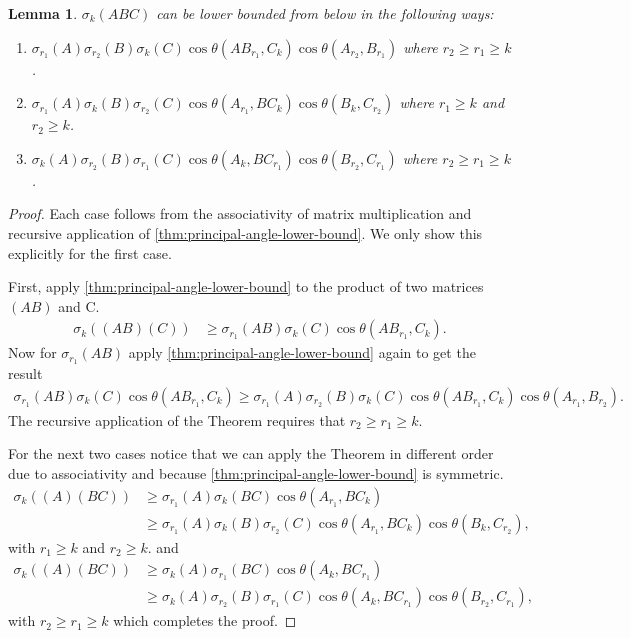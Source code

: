 \documentclass{article}
\newcommand{\prinangle}{\cos\theta}
\theoremstyle{plain}
\newtheorem{lemma}[theorem]{Lemma}
\theoremstyle{definition}
\theoremstyle{remark}
\begin{document}
\begin{lemma}
\label{lemma:principal-angle-lower-bound-3-matrices}
$\sigma_k(ABC)$ can be lower bounded from below in the following ways:
\begin{enumerate}
    \item $\sigma_{r_1}(A)\sigma_{r_2}(B)\sigma_k(C) \prinangle(AB_{r_1},C_k)\prinangle(A_{r_2}, B_{r_1})$ where $r_2 \geq r_1 \ge k$.
    \item $\sigma_{r_1}(A)\sigma_{k}(B)\sigma_{r_2}(C) \prinangle(A_{r_1},BC_k)\prinangle(B_k, C_{r_2}) $ where $r_1 \geq k$ and $r_2 \ge k$.
    \item $\sigma_{k}(A)\sigma_{r_2}(B)\sigma_{r_1}(C) \prinangle(A_{k},BC_{r_1})\prinangle(B_{r_2}, C_{r_1})$ where $r_2 \geq r_1 \ge k$.
\end{enumerate}
\end{lemma}
\begin{proof}
Each case follows from the associativity of matrix multiplication and recursive application of \cref{thm:principal-angle-lower-bound}. We only show this explicitly for the first case.

First, apply \cref{thm:principal-angle-lower-bound} to the product of two matrices $(AB)$ and C.
\begin{align*}
\sigma_k((AB)(C)) &\geq \sigma_{r_1}(AB)\sigma_k(C) \prinangle(AB_{r_1},C_k).
\end{align*}
Now for $\sigma_{r_1}(AB)$ apply \cref{thm:principal-angle-lower-bound} again to get the result
\begin{align*}
\sigma_{r_1}(AB)\sigma_k(C) \prinangle(AB_{r_1},C_k) \geq \sigma_{r_1}(A)\sigma_{r_2}(B)\sigma_k(C) \prinangle(AB_{r_1},C_k)\prinangle(A_{r_1}, B_{r_2}).
\end{align*}
The recursive application of the Theorem requires that $r_2 \geq r_1 \ge k$.

For the next two cases notice that we can apply the Theorem in different order due to associativity and because \cref{thm:principal-angle-lower-bound} is symmetric.
\begin{align*}
\sigma_k\left((A)(BC)\right) &\geq \sigma_{r_1}(A)\sigma_k(BC) \prinangle(A_{r_1},BC_k)  \\
&\geq \sigma_{r_1}(A)\sigma_{k}(B)\sigma_{r_2}(C) \prinangle(A_{r_1},BC_k)\prinangle(B_k, C_{r_2}), 
\end{align*} with $r_1 \geq k$ and $r_2 \ge k$.
and 
\begin{align*}
\sigma_k\left((A)(BC)\right) &\geq \sigma_{k}(A)\sigma_{r_1}(BC) \prinangle(A_k,BC_{r_1})  \\
&\geq \sigma_{k}(A)\sigma_{r_2}(B)\sigma_{r_1}(C) \prinangle(A_{k},BC_{r_1})\prinangle(B_{r_2}, C_{r_1}),
\end{align*} with $r_2 \geq r_1 \ge k$
which completes the proof. 
\end{proof}
\end{document}
